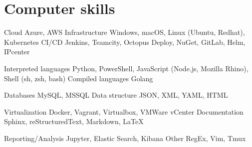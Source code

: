 \section{Computer skills}

\cvcomputer %
  {Cloud}
    {Azure, AWS}
  {Infrastructure}
    {Windows, macOS, Linux (Ubuntu, Redhat), Kubernetes}
  {CI/CD}
    {Jenkins, Teamcity, Octopus Deploy, NuGet, GitLab, Helm, IPcenter}

\cvcomputer %
  {Interpreted languages}
    {Python, PowerShell, JavaScript (Node.js, Mozilla Rhino), Shell (sh, zsh, bash)}
  {Compiled languages}
    {Golang}

\cvcomputer %
  {Databases}
    {MySQL, MSSQL}
  {Data structure}
    {JSON, XML, YAML, HTML}

\cvcomputer %
  {Virtualization}
    {Docker, Vagrant, Virtualbox, VMWare vCenter}
  {Documentation}
    {Sphinx, reStructuredText, Markdown, LaTeX}

\cvcomputer %
  {Reporting/Analysis}
    {Jupyter, Elastic Search, Kibana}
  {Other}
    {RegEx, Vim, Tmux}

\closesection{}
